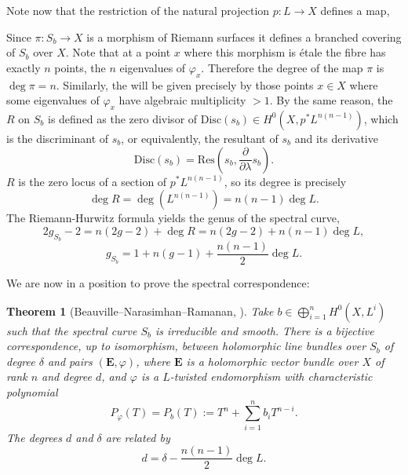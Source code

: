 \documentclass[12pt,a4paper]{book}
\newtheorem{thm}{Theorem}[section]
\theoremstyle{definition} \newtheorem{defn}[thm]{Definition}
\theoremstyle{definition} \newtheorem{ejemplo}[thm]{Example}
\theoremstyle{remark} \newtheorem{rem}[thm]{Remark}
\def\Disc{\mathrm{Disc}}
\def\Res{\mathrm{Res}}
\newcommand{\ve}[1]{\mathbf{#1}}
\let\emph\relax
\begin{document}
       Note now that the restriction of the natural projection $p:L\rightarrow X$ defines a map,
       \begin{center}
	\end{center}
	Since $\pi:S_b\rightarrow X$ is a morphism of Riemann surfaces it defines a branched covering of $S_b$ over $X$. Note that at a point $x$ where this morphism is étale the fibre has exactly $n$ points, the $n$ eigenvalues of $\varphi_x$. Therefore the degree of the map $\pi$ is $\deg \pi = n$. Similarly, the \emph{branch locus} will be given precisely by those points $x\in X$ where some eigenvalues of $\varphi_x$ have algebraic multiplicity $>1$. By the same reason, the \emph{ramification divisor} $R$ on $S_b$ is defined as the zero divisor of $\Disc(s_b)\in H^0(X,p^*L^{n(n-1)})$, which is the discriminant of $s_b$, or equivalently, the resultant of $s_b$ and its derivative
	\begin{equation*}
	  \Disc(s_b)=\Res\left(s_b, \frac{\partial}{\partial \lambda} s_b\right).
	\end{equation*}
	$R$ is the zero locus of a section of $p^*L^{n(n-1)}$, so its degree is precisely
	\begin{equation*}
	  \deg R = \deg (L^{n(n-1)})=n(n-1)\deg L.
	\end{equation*}
	The Riemann-Hurwitz formula yields the genus of the spectral curve,
	\begin{equation*}
	  2g_{S_b} - 2 = n(2g-2) + \deg R = n(2g-2) + n(n-1)\deg L,
	\end{equation*}
	\begin{equation*}
	  g_{S_b}= 1+n(g-1)+ \frac{n(n-1)}{2}\deg L.
	\end{equation*}

	We are now in a position to prove the spectral correspondence:
	\begin{thm}[Beauville--Narasimhan--Ramanan, \cite{bnr}]
	  Take $b \in \bigoplus_{i=1}^n H^0(X,L^i)$ such that the spectral curve $S_b$ is irreducible and smooth. There is a bijective correspondence, up to isomorphism, between holomorphic line bundles over $S_b$ of degree $\delta$ and pairs $(\ve{E},\varphi)$, where $\ve{E}$ is a holomorphic vector bundle over $X$ of rank $n$ and degree $d$, and $\varphi$ is a $L$-twisted endomorphism with characteristic polynomial
	  \begin{equation*}
	    P_\varphi(T)=P_b(T):=T^n + \sum_{i=1}^n b_i T^{n-i}.   
	  \end{equation*}
	  The degrees $d$ and $\delta$ are related by
	  \begin{equation*}
	    d=\delta - \frac{n(n-1)}{2}\deg L .
	  \end{equation*}
	\end{thm}
\end{document}
